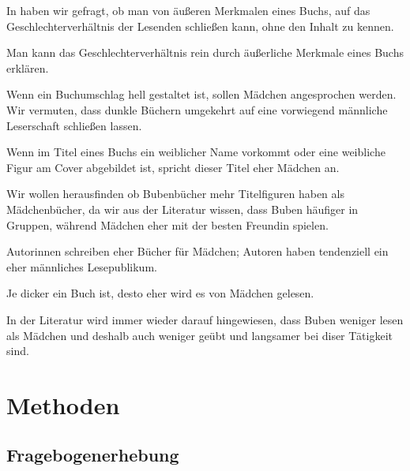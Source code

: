 In  haben wir gefragt, ob man von äußeren Merkmalen
eines Buchs, auf das Geschlechterverhältnis der Lesenden schließen kann,
ohne den Inhalt zu kennen.

\begin{hyp}\label{h5} Man kann das Geschlechterverhältnis rein durch äußerliche Merkmale eines Buchs erklären. \end{hyp}

\begin{subhyp}\label{h5.1} Wenn ein Buchumschlag hell gestaltet ist, sollen Mädchen angesprochen werden. Wir vermuten, dass dunkle Büchern umgekehrt auf eine vorwiegend männliche Leserschaft schließen lassen.\end{subhyp}

\begin{subhyp}\label{h5.2} Wenn im Titel eines Buchs ein weiblicher Name vorkommt oder eine weibliche Figur am Cover abgebildet ist, spricht dieser Titel eher Mädchen an.\end{subhyp}

Wir wollen herausfinden ob Bubenbücher mehr Titelfiguren haben als
Mädchenbücher, da wir aus der Literatur wissen, dass Buben häufiger in
Gruppen, während Mädchen eher mit der besten Freundin spielen.

\begin{subhyp}\label{h5.3} Autorinnen schreiben eher Bücher für Mädchen; Autoren haben tendenziell ein eher männliches Lesepublikum.\end{subhyp}

\begin{subhyp}\label{h5.4} Je dicker ein Buch ist, desto eher wird es von Mädchen gelesen.\end{subhyp}

In der Literatur wird immer wieder darauf hingewiesen, dass Buben
weniger lesen als Mädchen und deshalb auch weniger geübt und langsamer
bei diser Tätigkeit sind.

\section{Methoden}

\subsection{Fragebogenerhebung}

